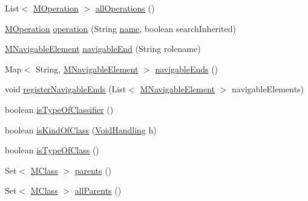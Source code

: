 \begin{DoxyCompactItemize}
\item 
List$<$ \hyperlink{classorg_1_1tzi_1_1use_1_1uml_1_1mm_1_1_m_operation}{M\-Operation} $>$ \hyperlink{classorg_1_1tzi_1_1use_1_1uml_1_1mm_1_1_m_class_impl_ae5a140e1411be46c43159db0e7ef2ac0}{all\-Operations} ()
\item 
\hyperlink{classorg_1_1tzi_1_1use_1_1uml_1_1mm_1_1_m_operation}{M\-Operation} \hyperlink{classorg_1_1tzi_1_1use_1_1uml_1_1mm_1_1_m_class_impl_a6c2b18af44fd715a6ce59688fe264779}{operation} (String \hyperlink{classorg_1_1tzi_1_1use_1_1uml_1_1mm_1_1_m_model_element_impl_ac9997b04c10d247c21c22d431d99400d}{name}, boolean search\-Inherited)
\item 
\hyperlink{interfaceorg_1_1tzi_1_1use_1_1uml_1_1mm_1_1_m_navigable_element}{M\-Navigable\-Element} \hyperlink{classorg_1_1tzi_1_1use_1_1uml_1_1mm_1_1_m_class_impl_a3c0eeb1c6256c8bccff9b2e79dc9f615}{navigable\-End} (String rolename)
\item 
Map$<$ String, \hyperlink{interfaceorg_1_1tzi_1_1use_1_1uml_1_1mm_1_1_m_navigable_element}{M\-Navigable\-Element} $>$ \hyperlink{classorg_1_1tzi_1_1use_1_1uml_1_1mm_1_1_m_class_impl_ac8c4e5262f1fffc4d2178f9e9afd9554}{navigable\-Ends} ()
\item 
void \hyperlink{classorg_1_1tzi_1_1use_1_1uml_1_1mm_1_1_m_class_impl_adeb4fd7ca82120d1f83944ffa906ddc3}{register\-Navigable\-Ends} (List$<$ \hyperlink{interfaceorg_1_1tzi_1_1use_1_1uml_1_1mm_1_1_m_navigable_element}{M\-Navigable\-Element} $>$ navigable\-Elements)
\item 
boolean \hyperlink{classorg_1_1tzi_1_1use_1_1uml_1_1mm_1_1_m_class_impl_aa9ef4b4bb733f71c3627cb1d96430a77}{is\-Type\-Of\-Classifier} ()
\item 
boolean \hyperlink{classorg_1_1tzi_1_1use_1_1uml_1_1mm_1_1_m_class_impl_a202d9d37f684614e1bb1fa56c58871c8}{is\-Kind\-Of\-Class} (\hyperlink{enumorg_1_1tzi_1_1use_1_1uml_1_1ocl_1_1type_1_1_type_1_1_void_handling}{Void\-Handling} h)
\item 
boolean \hyperlink{classorg_1_1tzi_1_1use_1_1uml_1_1mm_1_1_m_class_impl_a271aea1ab9561b064c0fbd5bb5d3e328}{is\-Type\-Of\-Class} ()
\item 
Set$<$ \hyperlink{interfaceorg_1_1tzi_1_1use_1_1uml_1_1mm_1_1_m_class}{M\-Class} $>$ \hyperlink{classorg_1_1tzi_1_1use_1_1uml_1_1mm_1_1_m_class_impl_a3b2c337ccfd15096b06fb7f4f5d1b9c6}{parents} ()
\item 
Set$<$ \hyperlink{interfaceorg_1_1tzi_1_1use_1_1uml_1_1mm_1_1_m_class}{M\-Class} $>$ \hyperlink{classorg_1_1tzi_1_1use_1_1uml_1_1mm_1_1_m_class_impl_a9449d7d33936bbb9125805783f9a4b11}{all\-Parents} ()

\end{DoxyCompactItemize}
